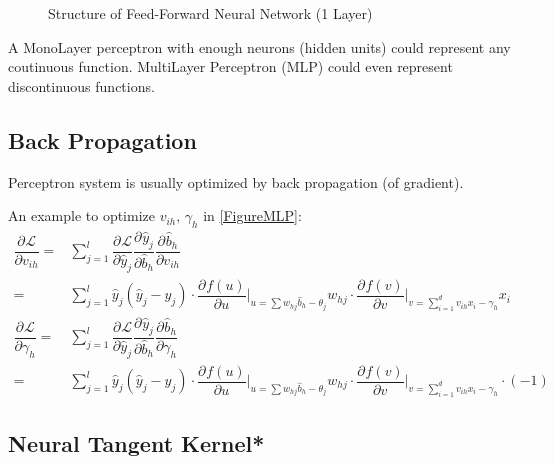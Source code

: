 \begin{figure}[H]
\begin{tikzpicture}[shorten >=1pt,->,draw=black!50, node distance=\layersep]


\end{tikzpicture}

\caption{Structure of Feed-Forward Neural Network (1 Layer)}
\label{FigureMLP}
\end{figure}
    
    
    A MonoLayer perceptron with enough neurons (hidden units) could represent any coutinuous function. MultiLayer Perceptron (MLP) could even represent discontinuous functions. 
    
\subsection{Back Propagation}
    Perceptron system is usually optimized by back propagation (of gradient).

    An example to optimize $ v_{ih},\,\gamma _h $ in \autoref{FigureMLP}:
    \begin{align}
        \dfrac{\partial^{} \mathcal{L}}{\partial v_{ih}}=&\sum_{j=1}^l\dfrac{\partial^{} \mathcal{L}}{\partial \hat{y}_j^{}}\dfrac{\partial^{} \hat{y}_j}{\partial \hat{b}_h^{}}\dfrac{\partial^{} \hat{b}_h}{\partial v_{ih}}\\
        =&\sum_{j=1}^l\hat{y}_j(\hat{y}_j-y_j)\cdot \dfrac{\partial^{} f(u)}{\partial u^{}}\Big|_{u=\sum w_{hj}\hat{b}_h-\theta _j}w_{hj}\cdot \dfrac{\partial^{} f(v)}{\partial v^{}}\Big|_{v=\sum_{i=1}^dv_{ih}x_i-\gamma _h}x_i\\
        \dfrac{\partial^{} \mathcal{L}}{\partial \gamma _h}=&\sum_{j=1}^l\dfrac{\partial^{} \mathcal{L}}{\partial \hat{y}_j^{}}\dfrac{\partial^{} \hat{y}_j}{\partial \hat{b}_h^{}}\dfrac{\partial^{} \hat{b}_h}{\partial \gamma _h}\\
        =&\sum_{j=1}^l\hat{y}_j(\hat{y}_j-y_j)\cdot \dfrac{\partial^{} f(u)}{\partial u^{}}\Big|_{u=\sum w_{hj}\hat{b}_h-\theta _j}w_{hj}\cdot \dfrac{\partial^{} f(v)}{\partial v^{}}\Big|_{v=\sum_{i=1}^dv_{ih}x_i-\gamma _h}\cdot (-1)
    \end{align}
    
    
\subsection{Neural Tangent Kernel*}

